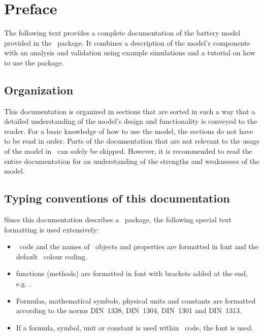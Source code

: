 \section*{Preface}
The following text provides a complete documentation of the battery model provided in the  \matlab\ package. It combines a description of the model's components with an analysis and validation using example simulations and a tutorial on how to use the package.

\subsection*{Organization}
This documentation is organized in sections that are sorted in such a way that a detailed understanding of the model's design and functionality is conveyed to the reader. For a basic knowledge of how to use the model, the sections do not have to be read in order. Parts of the documentation that are not relevant to the usage of the model in \matlab\ can safely be skipped. However, it is recommended to read the entire documentation for an understanding of the strengths and weaknesses of the model.

\subsection*{Typing conventions of this documentation}
Since this documentation describes a \matlab\ package, the following special text formatting is used extensively:
\begin{itemize}
	\item \matlab\ code and the names of \matlab\ objects and properties are formatted in  font and the default \matlab\ colour coding.
	\item \matlab functions (methods) are formatted in  font with brackets added at the end, e.g. .
	\item Formulas, mathematical symbols, physical units and constants are formatted according to the norms DIN~1338, DIN~1304, DIN~1301 and DIN~1313.
	\item If a formula, symbol, unit or constant is used within \matlab\ code, the  font is used.
\end{itemize}

